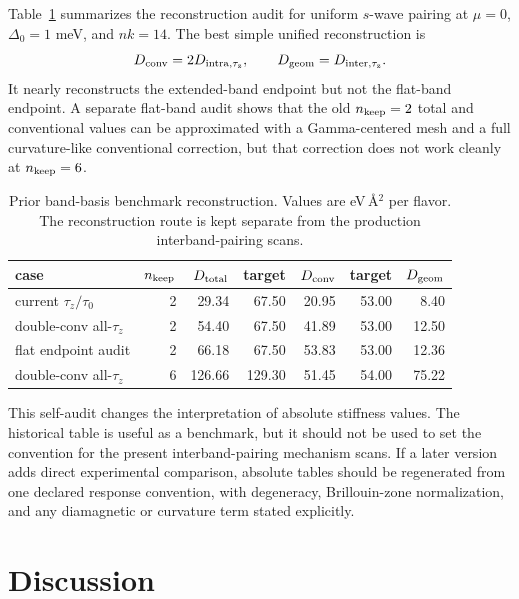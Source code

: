 \documentclass[aps,prb,reprint,superscriptaddress,floatfix,nofootinbib]{revtex4-2}
\begin{document}
Table~\ref{tab:prb_audit} summarizes the reconstruction audit for uniform
$s$-wave pairing at $\mu=0$, $\Delta_0=1$ meV, and $nk=14$.
The best simple unified reconstruction is
\begin{equation}
  D_{\rm conv}=2D_{\rm intra,\tau_z},\qquad
  D_{\rm geom}=D_{\rm inter,\tau_z}.
\end{equation}
It nearly reconstructs the extended-band endpoint but not the flat-band
endpoint.
A separate flat-band audit shows that the old $n_{\rm keep}=2$ total and
conventional values can be approximated with a Gamma-centered mesh and a full
curvature-like conventional correction, but that correction does not work
cleanly at $n_{\rm keep}=6$.

\begin{table}[t]
\caption{Prior band-basis benchmark reconstruction.
Values are eV\,\AA$^2$ per flavor.  The reconstruction route is kept separate
from the production interband-pairing scans.
}
\label{tab:prb_audit}
\begin{ruledtabular}
\begin{tabular}{lrrrrrr}
case & $n_{\rm keep}$ & $D_{\rm total}$ & target & $D_{\rm conv}$ & target & $D_{\rm geom}$\\
\hline
current $\tau_z/\tau_0$ & 2 & 29.34 & 67.50 & 20.95 & 53.00 & 8.40\\
double-conv all-$\tau_z$ & 2 & 54.40 & 67.50 & 41.89 & 53.00 & 12.50\\
flat endpoint audit & 2 & 66.18 & 67.50 & 53.83 & 53.00 & 12.36\\
double-conv all-$\tau_z$ & 6 & 126.66 & 129.30 & 51.45 & 54.00 & 75.22\\
\end{tabular}
\end{ruledtabular}
\end{table}

This self-audit changes the interpretation of absolute stiffness values.
The historical table is useful as a benchmark, but it should not be used to
set the convention for the present interband-pairing mechanism scans.
If a later version adds direct experimental comparison, absolute tables should
be regenerated from one declared response convention, with degeneracy,
Brillouin-zone normalization, and any diamagnetic or curvature term stated
explicitly.

\section{Discussion}
\end{document}
